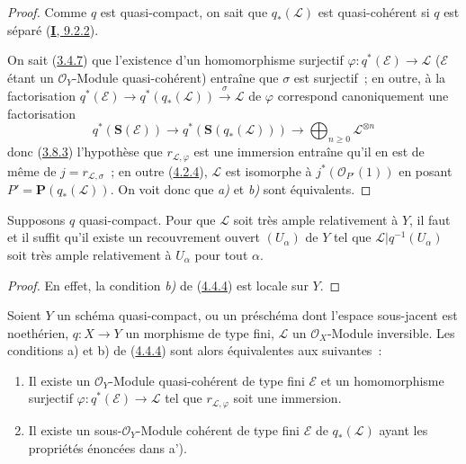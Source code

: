 \begin{proof}
Comme $q$ est quasi-compact, on sait que $q_*(\mathcal{L})$ est quasi-cohérent
si $q$ est séparé (\hyperref[I.9.2.2-fr]{\textbf{I}, 9.2.2}).


On sait (\hyperref[II.3.4.7-fr]{3.4.7}) que l'existence d'un homomorphisme
surjectif $\varphi:q^*(\mathcal{E})\to\mathcal{L}$ ($\mathcal{E}$ étant un
$\mathcal{O}_Y$-Module quasi-cohérent) entraîne que $\sigma$ est surjectif~;
en outre, à la factorisation
$q^*(\mathcal{E})\to q^*(q_*(\mathcal{L}))\xrightarrow{\sigma}\mathcal{L}$
de $\varphi$ correspond canoniquement une factorisation
\[
  q^*(\mathbf{S}(\mathcal{E}))
    \longrightarrow q^*(\mathbf{S}(q_*(\mathcal{L})))
    \longrightarrow\bigoplus_{n\geq0}\mathcal{L}^{\otimes n}
\]
donc (\hyperref[II.3.8.3-fr]{3.8.3}) l'hypothèse que
$r_{\mathcal{L},\varphi}$ est une immersion entraîne qu'il en est de même de
$j=r_{\mathcal{L},\sigma}$~; en outre
(\hyperref[II.4.2.4-fr]{4.2.4}), $\mathcal{L}$ est isomorphe à
$j^*(\mathcal{O}_{P'}(1))$ en posant
$P'=\mathbf{P}(q_*(\mathcal{L}))$. On voit donc que \emph{a)} et \emph{b)} sont
équivalents.
\end{proof}

\begin{corollary}[4.4.5]
\label{II.4.4.5-fr}
Supposons $q$ quasi-compact. Pour que $\mathcal{L}$ soit très ample
relativement à $Y$, il faut et il suffit qu'il existe un recouvrement ouvert
$(U_\alpha)$ de $Y$ tel que
$\mathcal{L}|q^{-1}(U_\alpha)$ soit très ample relativement à $U_\alpha$ pour
tout $\alpha$.
\end{corollary}

\begin{proof}
En effet, la condition \emph{b)} de (\hyperref[II.4.4.4-fr]{4.4.4}) est locale sur
$Y$.
\end{proof}

\begin{proposition}[4.4.6]
\label{II.4.4.6-fr}
Soient $Y$ un schéma quasi-compact, ou un préschéma dont l'espace sous-jacent
est noethérien, $q:X\to Y$ un morphisme \textup{de type fini}, $\mathcal{L}$ un
$\mathcal{O}_X$-Module inversible. Les conditions \textup{a)} et \textup{b)} de
\textup{(\hyperref[II.4.4.4-fr]{4.4.4})} sont alors équivalentes aux suivantes~:
\begin{enumerate}
  \item[\rm{a')}] Il existe un $\mathcal{O}_Y$-Module quasi-cohérent \textup{de type
  fini} $\mathcal{E}$ et un homomorphisme surjectif
  $\varphi:q^*(\mathcal{E})\to\mathcal{L}$ tel que
  $r_{\mathcal{L},\varphi}$ soit une immersion.
  \item[\rm{b')}] Il existe un sous-$\mathcal{O}_Y$-Module cohérent \textup{de type
  fini} $\mathcal{E}$ de $q_*(\mathcal{L})$ ayant les propriétés énoncées dans
  \textup{a')}.
\end{enumerate}
\end{proposition}

